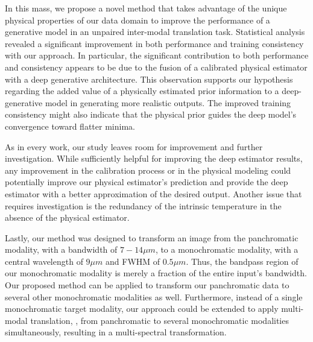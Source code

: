In this mass, we propose a novel method that takes advantage of the unique physical properties of our data domain to improve the performance of a generative model in an unpaired inter-modal translation task. 
Statistical analysis revealed a significant improvement in both performance and training consistency with our approach.
In particular, the significant contribution to both performance and consistency appears to be due to the fusion of a calibrated physical estimator with a deep generative architecture. 
This observation supports our hypothesis regarding the added value of a physically estimated prior information to a deep-generative model in generating more realistic outputs.
The improved training consistency might also indicate that the physical prior guides the deep model's convergence toward flatter minima.

As in every work, our study leaves room for improvement and further investigation.
While sufficiently helpful for improving the deep estimator results, any improvement in the calibration process or in the physical modeling could potentially improve our physical estimator's prediction and provide the deep estimator with a better approximation of the desired output.
Another issue that requires investigation is the redundancy of the intrinsic temperature in the absence of the physical estimator.

Lastly, our method was designed to transform an image from the panchromatic modality, with a bandwidth of $7 - 14 \mu m$, to a monochromatic modality, with a central wavelength of $9\mu m$ and FWHM of $0.5 \mu m$.
Thus, the bandpass region of our monochromatic modality is merely a fraction of the entire input's bandwidth.
Our proposed method can be applied to transform our panchromatic data to several other monochromatic modalities as well.
Furthermore, instead of a single monochromatic target modality, our approach could be extended to apply multi-modal translation, \ie, from panchromatic to several monochromatic modalities simultaneously, resulting in a multi-spectral transformation.